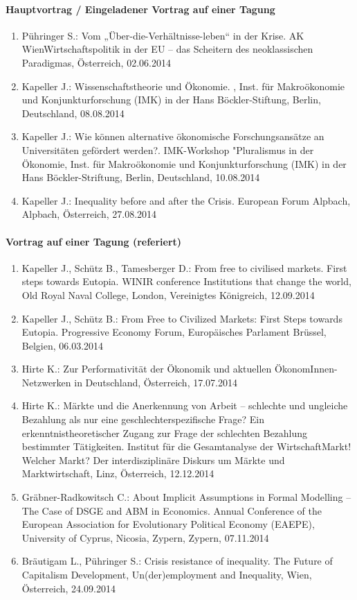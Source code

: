 \paragraph{Hauptvortrag / Eingeladener Vortrag auf einer Tagung}
\begin{enumerate}
	\item Pühringer S.: Vom „Über-die-Verhältnisse-leben“ in der Krise. AK WienWirtschaftspolitik in der EU – das Scheitern des neoklassischen Paradigmas, Österreich, 02.06.2014
	\item Kapeller J.: Wissenschaftstheorie und Ökonomie. , Inst. für Makroökonomie und Konjunkturforschung (IMK) in der Hans Böckler-Stiftung, Berlin, Deutschland, 08.08.2014
	\item Kapeller J.: Wie können alternative ökonomische Forschungsansätze an Universitäten gefördert werden?\glqq . IMK-Workshop "Pluralismus in der Ökonomie\grqq{}, Inst. für Makroökonomie und Konjunkturforschung (IMK) in der Hans Böckler-Striftung, Berlin, Deutschland, 10.08.2014
	\item Kapeller J.: Inequality before and after the Crisis. European Forum Alpbach, Alpbach, Österreich, 27.08.2014
\end{enumerate}
\paragraph{Vortrag auf einer Tagung (referiert)}
\begin{enumerate}
	\item Kapeller J., Schütz B., Tamesberger D.: From free to civilised markets. First steps towards Eutopia. WINIR conference \glqq Institutions that change the world\grqq{}, Old Royal Naval College, London, Vereinigtes Königreich, 12.09.2014
	\item Kapeller J., Schütz B.: From Free to Civilized Markets: First Steps towards Eutopia. Progressive Economy Forum, Europäisches Parlament Brüssel, Belgien, 06.03.2014
	\item Hirte K.: Zur Performativität der Ökonomik und aktuellen ÖkonomInnen-Netzwerken in Deutschland, Österreich, 17.07.2014
	\item Hirte K.: Märkte und die Anerkennung von Arbeit – schlechte und ungleiche Bezahlung als nur eine geschlechterspezifische Frage? Ein erkenntnistheoretischer Zugang zur Frage der schlechten Bezahlung bestimmter Tätigkeiten. Institut für die Gesamtanalyse der WirtschaftMarkt! Welcher Markt? Der interdisziplinäre Diskurs um Märkte und Marktwirtschaft, Linz, Österreich, 12.12.2014
	\item Gräbner-Radkowitsch C.: About Implicit Assumptions in Formal Modelling – The Case of DSGE and ABM in Economics. Annual Conference of the European Association for Evolutionary Political Economy (EAEPE), University of Cyprus, Nicosia, Zypern, Zypern, 07.11.2014
	\item Bräutigam L., Pühringer S.: Crisis resistance of inequality. The Future of Capitalism Development, Un(der)employment and Inequality, Wien, Österreich, 24.09.2014
\end{enumerate}

